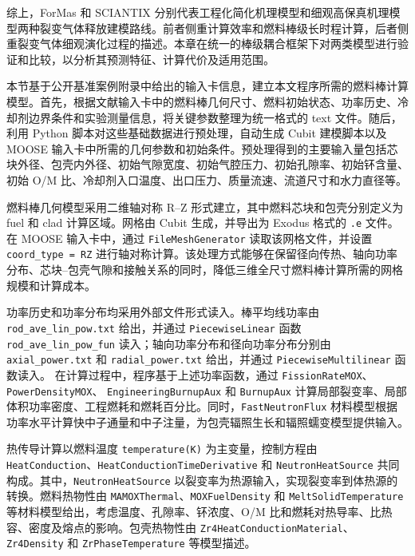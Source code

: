 综上，ForMas 和 SCIANTIX 分别代表工程化简化机理模型和细观高保真机理模型两种裂变气体释放建模路线。前者侧重计算效率和燃料棒级长时程计算，后者侧重裂变气体细观演化过程的描述。本章在统一的棒级耦合框架下对两类模型进行验证和比较，以分析其预测特征、计算代价及适用范围。


本节基于公开基准案例附录中给出的输入卡信息，建立本文程序所需的燃料棒计算模型。首先，根据文献输入卡中的燃料棒几何尺寸、燃料初始状态、功率历史、冷却剂边界条件和实验测量信息，将关键参数整理为统一格式的 text 文件。随后，利用 Python 脚本对这些基础数据进行预处理，自动生成 Cubit 建模脚本以及 MOOSE 输入卡中所需的几何参数和初始条件。预处理得到的主要输入量包括芯块外径、包壳内外径、初始气隙宽度、初始气腔压力、初始孔隙率、初始钚含量、初始 O/M 比、冷却剂入口温度、出口压力、质量流速、流道尺寸和水力直径等。

燃料棒几何模型采用二维轴对称 R--Z 形式建立，其中燃料芯块和包壳分别定义为 fuel 和 clad 计算区域。网格由 Cubit 生成，并导出为 Exodus 格式的 \texttt{.e} 文件。在 MOOSE 输入卡中，通过 \texttt{FileMeshGenerator} 读取该网格文件，并设置 \texttt{coord\_type = RZ} 进行轴对称计算。该处理方式能够在保留径向传热、轴向功率分布、芯块--包壳气隙和接触关系的同时，降低三维全尺寸燃料棒计算所需的网格规模和计算成本。

功率历史和功率分布均采用外部文件形式读入。棒平均线功率由
\texttt{rod\_\allowbreak ave\_\allowbreak lin\_\allowbreak pow.\allowbreak txt}
给出，并通过 \texttt{PiecewiseLinear} 函数
\texttt{rod\_\allowbreak ave\_\allowbreak lin\_\allowbreak pow\_\allowbreak fun}
读入；轴向功率分布和径向功率分布分别由
\texttt{axial\_\allowbreak power.\allowbreak txt}
和
\texttt{radial\_\allowbreak power.\allowbreak txt}
给出，并通过 \texttt{PiecewiseMultilinear} 函数读入。
在计算过程中，程序基于上述功率函数，通过
\texttt{Fission\allowbreak RateMOX}、\texttt{PowerDensityMOX}、
\texttt{EngineeringBurnupAux} 和 \texttt{BurnupAux}
计算局部裂变率、局部体积功率密度、工程燃耗和燃耗百分比。同时，\texttt{FastNeutronFlux} 材料模型根据功率水平计算快中子通量和中子注量，为包壳辐照生长和辐照蠕变模型提供输入。

热传导计算以燃料温度 \texttt{temperature(K)} 为主变量，控制方程由 \texttt{HeatConduction}、\texttt{HeatConductionTimeDerivative} 和 \texttt{NeutronHeatSource} 共同构成。其中，\texttt{NeutronHeat\allowbreak Source} 以裂变率为热源输入，实现裂变率到体热源的转换。燃料热物性由 \texttt{MAMOXThermal}、\texttt{MOXFuelDensity} 和 \texttt{MeltSolidTemperature} 等材料模型给出，考虑温度、孔隙率、钚浓度、O/M 比和燃耗对热导率、比热容、密度及熔点的影响。包壳热物性由 \texttt{Zr4Heat\allowbreak ConductionMaterial}、\texttt{Zr4Density} 和 \texttt{ZrPhaseTemperature} 等模型描述。

